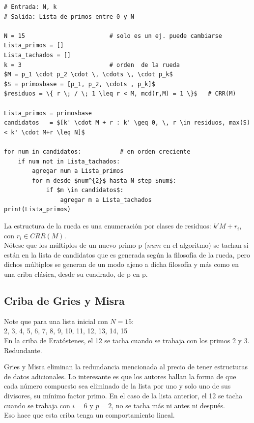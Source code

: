 \begin{lstlisting}[caption={Criba por rueda}, label={alg:AlgCribaRueda}, mathescape=true]
# Entrada: N, k
# Salida: Lista de primos entre 0 y N

N = 15                        # solo es un ej. puede cambiarse
Lista_primos = []
Lista_tachados = []
k = 3                         # orden  de la rueda
$M = p_1 \cdot p_2 \cdot \, \cdots \, \cdot p_k$
$S = primosbase = [p_1, p_2, \cdots , p_k]$
$residuos = \{ r \; / \; 1 \leq r < M, mcd(r,M) = 1 \}$   # CRR(M)

Lista_primos = primosbase
candidatos   = $[k' \cdot M + r : k' \geq 0, \, r \in residuos, max(S) < k' \cdot M+r \leq N]$

for num in candidatos:           # en orden creciente
    if num not in Lista_tachados:
        agregar num a Lista_primos
        for m desde $num^{2}$ hasta N step $num$:
            if $m \in candidatos$:
                agregar m a Lista_tachados
print(Lista_primos)
\end{lstlisting}

La estructura de la rueda es una enumeración por clases de residuos: $k'M + r_i$, con $r_i \in CRR(M)$. \\
Nótese que los múltiplos de un nuevo primo p ($num$ en el algoritmo) se tachan si están en la lista de candidatos que es generada según la filosofía de la rueda, pero dichos múltiplos se generan de un modo ajeno a dicha filosofía y más como en una criba clásica, desde su cuadrado, de p en p.

\subsection{Criba de Gries y Misra}
\label{sec:Gries}
Note que para una lista inicial con $N = 15$:\\
2, 3, 4, 5, 6, 7, 8, 9, 10, 11, 12, 13, 14, 15 \\
En la criba de Eratóstenes, el 12 se tacha cuando se trabaja con los primos 2 y 3. Redundante.

Gries y Misra \cite{Gries1978LinearSA} eliminan la redundancia mencionada al precio de tener estructuras de datos adicionales. Lo interesante es que los autores hallan la forma de que cada número compuesto sea eliminado de la lista por uno y solo uno de sus divisores, su mínimo factor primo. En el caso de la lista anterior, el 12 se tacha cuando se trabaja con $i = 6$ y $p = 2$, no se tacha más ni antes ni después. \\ 
Eso hace que esta criba tenga un comportamiento lineal. \\

